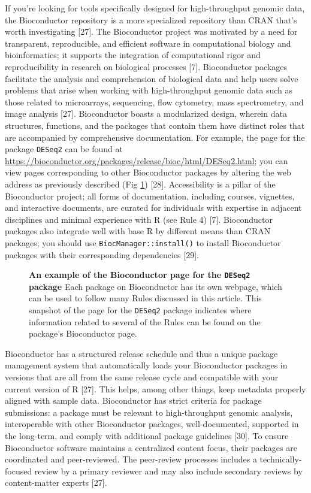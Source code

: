 \documentclass[10pt,letterpaper]{article}
\begin{document}
If you're looking for tools specifically designed for high-throughput
genomic data, the Bioconductor repository is a more specialized
repository than CRAN that's worth investigating {[}27{]}. The
Bioconductor project was motivated by a need for transparent,
reproducible, and efficient software in computational biology and
bioinformatics; it supports the integration of computational rigor and
reproducibility in research on biological processes {[}7{]}.
Bioconductor packages facilitate the analysis and comprehension of
biological data and help users solve problems that arise when working
with high-throughput genomic data such as those related to microarrays,
sequencing, flow cytometry, mass spectrometry, and image analysis
{[}27{]}. Bioconductor boasts a modularized design, wherein data
structures, functions, and the packages that contain them have distinct
roles that are accompanied by comprehensive documentation. For example,
the page for the package \texttt{DESeq2} can be found at
\url{https://bioconductor.org/packages/release/bioc/html/DESeq2.html};
you can view pages corresponding to other Bioconductor packages by
altering the web address as previously described (Fig \ref{fig5})
{[}28{]}. Accessibility is a pillar of the Bioconductor project; all
forms of documentation, including courses, vignettes, and interactive
documents, are curated for individuals with expertise in adjacent
disciplines and minimal experience with R (see Rule 4) {[}7{]}.
Bioconductor packages also integrate well with base R by different means
than CRAN packages; you should use \texttt{BiocManager::install()} to
install Bioconductor packages with their corresponding dependencies
{[}29{]}.

\begin{figure}[!h]
\caption{{\bf An example of the Bioconductor page for the \texttt{DESeq2} package}
Each package on Bioconductor has its own webpage, which can be used to follow many Rules discussed in this article. This snapshot of the page for the \texttt{DESeq2} package indicates where information related to several of the Rules can be found on the package's Bioconductor page.}
\label{fig5}
\end{figure}

Bioconductor has a structured release schedule and thus a unique package
management system that automatically loads your Bioconductor packages in
versions that are all from the same release cycle and compatible with
your current version of R {[}27{]}. This helps, among other things, keep
metadata properly aligned with sample data. Bioconductor has strict
criteria for package submissions: a package must be relevant to
high-throughput genomic analysis, interoperable with other Bioconductor
packages, well-documented, supported in the long-term, and comply with
additional package guidelines {[}30{]}. To ensure Bioconductor software
maintains a centralized content focus, their packages are coordinated
and peer-reviewed. The peer-review processes includes a
technically-focused review by a primary reviewer and may also include
secondary reviews by content-matter experts {[}27{]}.
\end{document}
